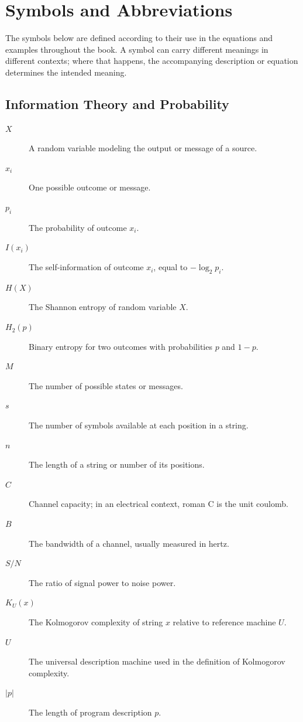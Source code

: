 \chapter*{Symbols and Abbreviations}

The symbols below are defined according to their use in the equations and examples throughout the book. A symbol can carry different meanings in different contexts; where that happens, the accompanying description or equation determines the intended meaning.

\section*{Information Theory and Probability}

\begin{description}
  \item[\(X\)] A random variable modeling the output or message of a source.
  \item[\(x_i\)] One possible outcome or message.
  \item[\(p_i\)] The probability of outcome \(x_i\).
  \item[\(I(x_i)\)] The self-information of outcome \(x_i\), equal to \(-\log_2 p_i\).
  \item[\(H(X)\)] The Shannon entropy of random variable \(X\).
  \item[\(H_2(p)\)] Binary entropy for two outcomes with probabilities \(p\) and \(1-p\).
  \item[\(M\)] The number of possible states or messages.
  \item[\(s\)] The number of symbols available at each position in a string.
  \item[\(n\)] The length of a string or number of its positions.
  \item[\(C\)] Channel capacity; in an electrical context, roman \(\mathrm{C}\) is the unit coulomb.
  \item[\(B\)] The bandwidth of a channel, usually measured in hertz.
  \item[\(S/N\)] The ratio of signal power to noise power.
  \item[\(K_U(x)\)] The Kolmogorov complexity of string \(x\) relative to reference machine \(U\).
  \item[\(U\)] The universal description machine used in the definition of Kolmogorov complexity.
  \item[\(|p|\)] The length of program description \(p\).
\end{description}

